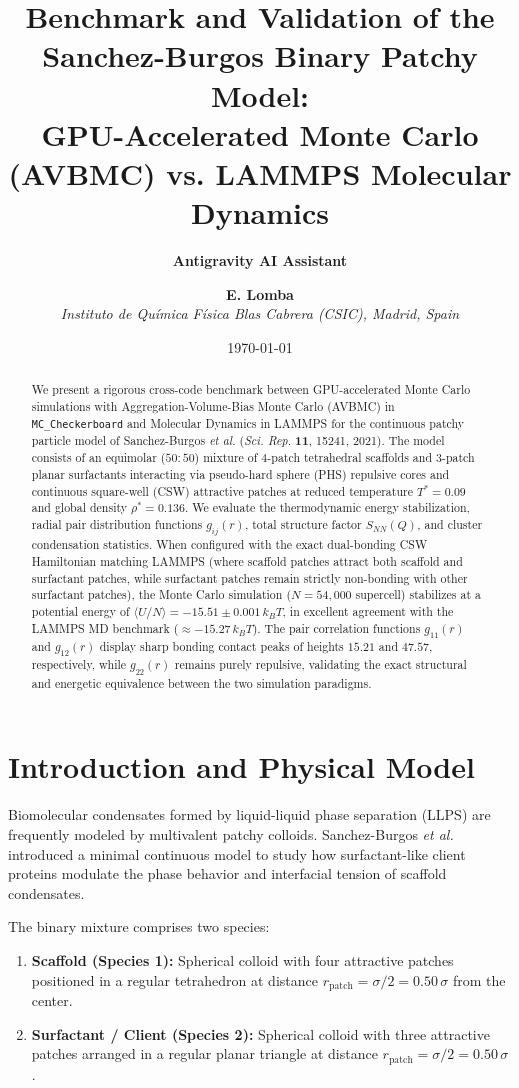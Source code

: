 \documentclass[11pt,a4paper]{article}
\title{\textbf{\Large Benchmark and Validation of the Sanchez-Burgos Binary Patchy Model:\\[0.3em] GPU-Accelerated Monte Carlo (AVBMC) vs. LAMMPS Molecular Dynamics}}
\author{\textbf{Antigravity AI Assistant} \and \textbf{E. Lomba}\\[0.5em]
\textit{Instituto de Qu\'imica F\'isica Blas Cabrera (CSIC), Madrid, Spain}}
\date{\today}
\begin{document}
\maketitle

\begin{abstract}
We present a rigorous cross-code benchmark between GPU-accelerated Monte Carlo simulations with Aggregation-Volume-Bias Monte Carlo (AVBMC) in \texttt{MC\_Checkerboard} and Molecular Dynamics in LAMMPS for the continuous patchy particle model of Sanchez-Burgos \textit{et al.} (\textit{Sci. Rep.} \textbf{11}, 15241, 2021). The model consists of an equimolar ($50:50$) mixture of $4$-patch tetrahedral scaffolds and $3$-patch planar surfactants interacting via pseudo-hard sphere (PHS) repulsive cores and continuous square-well (CSW) attractive patches at reduced temperature $T^* = 0.09$ and global density $\rho^* = 0.136$. We evaluate the thermodynamic energy stabilization, radial pair distribution functions $g_{ij}(r)$, total structure factor $S_{NN}(Q)$, and cluster condensation statistics. When configured with the exact dual-bonding CSW Hamiltonian matching LAMMPS (where scaffold patches attract both scaffold and surfactant patches, while surfactant patches remain strictly non-bonding with other surfactant patches), the Monte Carlo simulation ($N=54,000$ supercell) stabilizes at a potential energy of $\langle U/N \rangle = -15.51 \pm 0.001\,k_B T$, in excellent agreement with the LAMMPS MD benchmark ($\approx -15.27\,k_B T$). The pair correlation functions $g_{11}(r)$ and $g_{12}(r)$ display sharp bonding contact peaks of heights $15.21$ and $47.57$, respectively, while $g_{22}(r)$ remains purely repulsive, validating the exact structural and energetic equivalence between the two simulation paradigms.
\end{abstract}

\section{Introduction and Physical Model}

Biomolecular condensates formed by liquid-liquid phase separation (LLPS) are frequently modeled by multivalent patchy colloids. Sanchez-Burgos \textit{et al.}~\cite{sanchezburgos2021} introduced a minimal continuous model to study how surfactant-like client proteins modulate the phase behavior and interfacial tension of scaffold condensates. 

The binary mixture comprises two species:
\begin{enumerate}
    \item \textbf{Scaffold (Species 1):} Spherical colloid with four attractive patches positioned in a regular tetrahedron at distance $r_{\text{patch}} = \sigma/2 = 0.50\,\sigma$ from the center.
    \item \textbf{Surfactant / Client (Species 2):} Spherical colloid with three attractive patches arranged in a regular planar triangle at distance $r_{\text{patch}} = \sigma/2 = 0.50\,\sigma$.
\end{enumerate}
\end{document}
